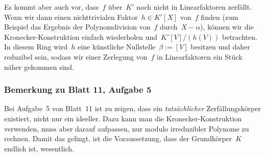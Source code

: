 \documentclass{../../alg2/algblatt}
\begin{document}
Es kommt aber auch vor, dass~$f$ über~$K'$ noch nicht in Linearfaktoren
zerfällt. Wenn wir dann einen nichttrivialen Faktor~$h \in K'[X]$ von~$f$
finden (zum Beispiel das Ergebnis der Polynomdivision von~$f$
durch~$X-\alpha$), können wir die Kronecker-Konstruktion einfach wiederholen
und~$K'[V]/(h(V))$ betrachten. In diesem Ring wird~$h$ eine künstliche
Nullstelle~$\beta := [V]$ besitzen und daher reduzibel sein, sodass wir einer
Zerlegung von~$f$ in Linearfaktoren ein Stück näher gekommen sind.


\subsubsection*{Bemerkung zu Blatt 11, Aufgabe 5}

Bei Aufgabe~5 von Blatt~11 ist zu zeigen, dass ein \emph{tatsächlicher}
Zerfällungskörper existiert, nicht nur ein ideeller. Dazu kann man die
Kronecker-Konstruktion verwenden, muss aber darauf aufpassen, nur modulo
irreduzibler Polynome zu rechnen. Damit das gelingt, ist die Voraussetzung,
dass der Grundkörper~$K$ endlich ist, wesentlich.
\end{document}
